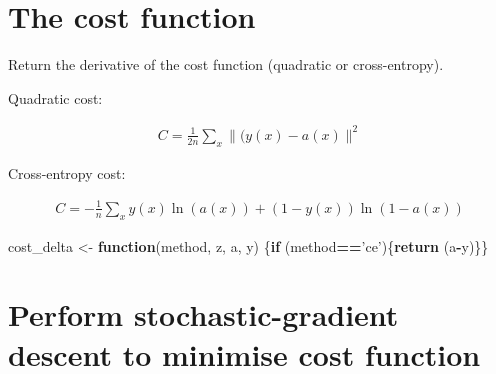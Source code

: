 \documentclass[]{book}
\newenvironment{Shaded}{\begin{snugshade}}{\end{snugshade}}
\newcommand{\ControlFlowTok}[1]{\textcolor[rgb]{0.13,0.29,0.53}{\textbf{#1}}}
\newcommand{\KeywordTok}[1]{\textcolor[rgb]{0.13,0.29,0.53}{\textbf{#1}}}
\newcommand{\NormalTok}[1]{#1}
\newcommand{\OperatorTok}[1]{\textcolor[rgb]{0.81,0.36,0.00}{\textbf{#1}}}
\newcommand{\StringTok}[1]{\textcolor[rgb]{0.31,0.60,0.02}{#1}}
\begin{document}
\hypertarget{the-cost-function}{%
\section{The cost function}\label{the-cost-function}}

Return the derivative of the cost function (quadratic or cross-entropy).

Quadratic cost:

\[\begin{aligned} 
   C = \frac{1}{2n}\sum_x\|(y(x) - a(x)\|^2
\end{aligned}\]

Cross-entropy cost:

\[\begin{aligned} 
   C = -\frac{1}{n}\sum_xy(x)\ln(a(x)) + (1 - y(x))\ln(1-a(x))
\end{aligned}\]

\begin{Shaded}
\begin{Highlighting}[]
\NormalTok{cost_delta <-}\StringTok{ }\ControlFlowTok{function}\NormalTok{(method, z, a, y) \{}\ControlFlowTok{if}\NormalTok{ (method}\OperatorTok{==}\StringTok{'ce'}\NormalTok{)\{}\KeywordTok{return}\NormalTok{ (a}\OperatorTok{-}\NormalTok{y)\}\}}
\end{Highlighting}
\end{Shaded}

\hypertarget{perform-stochastic-gradient-descent-to-minimise-cost-function}{%
\section{Perform stochastic-gradient descent to minimise cost function}\label{perform-stochastic-gradient-descent-to-minimise-cost-function}}
\end{document}
